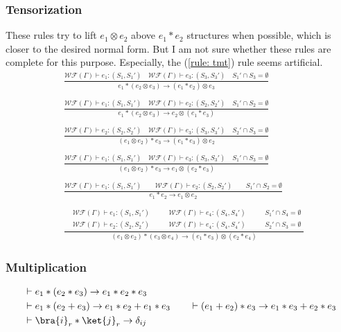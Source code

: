 \subsubsection*{Tensorization}
These rules try to lift $e_1 \otimes e_2$ above $e_1 * e_2$ structures when possible, which is closer to the desired normal form. But I am not sure whether these rules are complete for this purpose. Especially, the (\ref{rule: tmt}) rule seems artificial.
\begin{align*}
  & \frac{\mathcal{WF}(\Gamma)\vdash e_1 : (S_1, S_1')\quad \mathcal{WF}(\Gamma)\vdash e_3 : (S_3, S_3')\quad S_1' \cap S_3 = \emptyset}
  {e_1 * (e_2 \otimes e_3) \to (e_1 * e_2) \otimes e_3} \\
  &\ \\
  & \frac{\mathcal{WF}(\Gamma)\vdash e_1 : (S_1, S_1')\quad \mathcal{WF}(\Gamma)\vdash e_2 : (S_2, S_2')\quad S_1' \cap S_2 = \emptyset}
  {e_1 * (e_2 \otimes e_3) \to e_2 \otimes (e_1 * e_3)} \\
  &\ \\
  & \frac{\mathcal{WF}(\Gamma)\vdash e_2 : (S_2, S_2')\quad \mathcal{WF}(\Gamma)\vdash e_3 : (S_3, S_3')\quad S_2' \cap S_3 = \emptyset}
  {(e_1 \otimes e_2) * e_3 \to (e_1 * e_3) \otimes e_2} \\
  &\ \\
  & \frac{\mathcal{WF}(\Gamma)\vdash e_1 : (S_1, S_1')\quad \mathcal{WF}(\Gamma)\vdash e_3 : (S_3, S_3')\quad S_1' \cap S_3 = \emptyset}
  {(e_1 \otimes e_2) * e_3 \to e_1 \otimes(e_2* e_3)} \\
  &\ \\
  & \frac{\mathcal{WF}(\Gamma)\vdash e_1 : (S_1, S_1')\qquad \mathcal{WF}(\Gamma)\vdash e_2 : (S_2, S_2')\qquad S_1' \cap S_2 = \emptyset}
  {e_1 * e_2 \to e_1 \otimes e_2}\\
  &\ \\
  & \frac{
    \begin{aligned}
      & \mathcal{WF}(\Gamma) \vdash e_1 : (S_1, S_1')\qquad & \mathcal{WF}(\Gamma) \vdash e_4 : (S_4, S_4') \qquad & S_1' \cap S_4 = \emptyset\\
      & \mathcal{WF}(\Gamma) \vdash e_2 : (S_2, S_2') & \mathcal{WF}(\Gamma) \vdash e_4 : (S_4, S_4')\qquad & S_2' \cap S_3 = \emptyset
    \end{aligned}
  }{(e_1 \otimes e_2) * (e_3 \otimes e_4) \to (e_1 * e_3) \otimes (e_2 * e_4)} \tag{*} \label{rule: tmt}
\end{align*}

\subsubsection*{Multiplication}
\begin{align*}
  & \vdash e_1 * (e_2 * e_3) \to e_1 * e_2 * e_3\\
  & \vdash e_1 * (e_2 + e_3) \to e_1 * e_2 + e_1 * e_3
  \qquad \vdash (e_1 + e_2) * e_3 \to e_1 * e_3 + e_2 * e_3\\
  & \vdash \bra{i}_r * \ket{j}_r \to \delta_{ij}
\end{align*}

